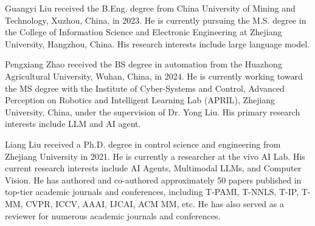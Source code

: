 \vspace{-3em}

\begin{IEEEbiography}{Guangyi Liu}
received the B.Eng. degree from China University of Mining and Technology, Xuzhou, China, in 2023. He is currently pursuing the M.S. degree in the College of Information Science and Electronic Engineering at Zhejiang University, Hangzhou, China. His research interests include large language model.
\end{IEEEbiography}

\vspace{-3em}

\begin{IEEEbiography}{Pengxiang Zhao}
received the BS degree in automation from the Huazhong Agricultural University, Wuhan, China, in 2024. He is currently working toward the MS degree with the Institute of Cyber-Systems and Control, Advanced Perception on Robotics and Intelligent Learning Lab (APRIL), Zhejiang University, China, under the supervision of Dr. Yong Liu. His primary research interests include LLM and AI agent.
\end{IEEEbiography}

\vspace{-3em}

\begin{IEEEbiography}{Liang Liu}
received a Ph.D. degree in control science and engineering from Zhejiang University in 2021. He is currently a researcher at the vivo AI Lab. His current research interests include AI Agents, Multimodal LLMs, and Computer Vision. He has authored and co-authored approximately 50 papers published in top-tier academic journals and conferences, including T-PAMI, T-NNLS, T-IP, T-MM, CVPR, ICCV, AAAI, IJCAI, ACM MM, etc. He has also served as a reviewer for numerous academic journals and conferences.
\end{IEEEbiography}


